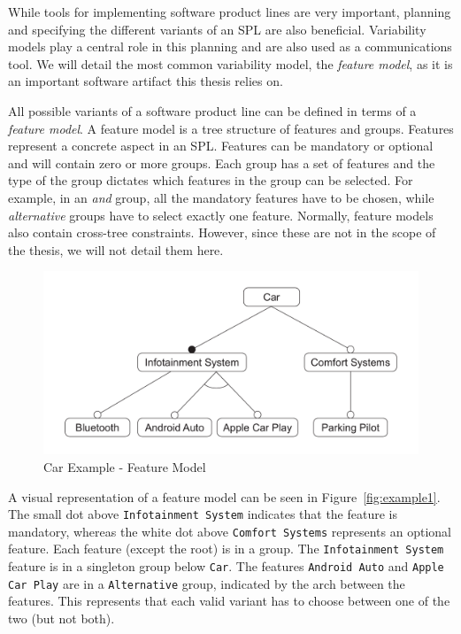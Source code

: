 \documentclass[a4paper,english]{ifimaster}
\begin{document}
While tools for implementing software product lines are very important, planning and specifying the different variants of an SPL are also beneficial. Variability models play a central role in this planning and are also used as a communications tool. We will detail the most common variability model, the \textit{feature model}, as it is an important software artifact this thesis relies on.

All possible variants of a software product line can be defined in terms of a \textit{feature model}. A feature model is a tree structure of features and groups. Features represent a concrete aspect in an SPL. Features can be mandatory or optional and will contain zero or more groups. Each group has a set of features and the type of the group dictates which features in the group can be selected. For example, in an \textit{and} group, all the mandatory features have to be chosen, while \textit{alternative} groups have to select exactly one feature. Normally, feature models also contain cross-tree constraints. However, since these are not in the scope of the thesis, we will not detail them here.

\begin{figure}[htpb]
	\centering
	\includegraphics[width=0.8\linewidth]{illustrations/example.pdf}
	\caption{Car Example - Feature Model}%
	\label{fig:example1}
\end{figure}

A visual representation of a feature model can be seen in Figure~\vref{fig:example1}. The small dot above \texttt{Infotainment System} indicates that the feature is mandatory, whereas the white dot above \texttt{Comfort Systems} represents an optional feature. Each feature (except the root) is in a group. The \texttt{Infotainment System} feature is in a singleton group below \texttt{Car}. The features \texttt{Android Auto} and \texttt{Apple Car Play} are in a \texttt{Alternative} group, indicated by the arch between the features. This represents that each valid variant has to choose between one of the two (but not both).
\end{document}
